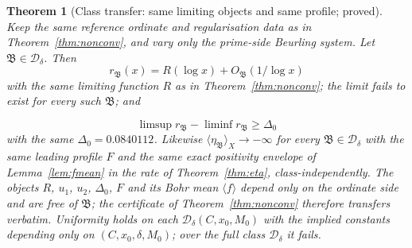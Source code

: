 \documentclass[11pt]{article}
\newtheorem{theorem}{Theorem}[section]
\newcommand{\Dclass}{\mathcal{D}_\delta}        %
\begin{document}
\begin{theorem}[Class transfer: same limiting objects and same profile;
proved]
\label{thm:class}
Keep the same reference ordinate and regularisation data as in
Theorem~\ref{thm:nonconv}, and vary only the prime-side Beurling system.
Let $\mathfrak{B}\in\Dclass$. Then 
\[
r_{\mathfrak{B}}(x)=R(\log x)+O_{\mathfrak{B}}(1/\log x)
\]
 with the \emph{same}
limiting function $R$ as in Theorem~\ref{thm:nonconv}; the limit fails to
exist for every such $\mathfrak{B}$; and

\[
\limsup r_{\mathfrak{B}}-\liminf r_{\mathfrak{B}}\ge\Delta_0
\]
 with the same $\Delta_0=0.0840112$.
Likewise $\langle\eta_{\mathfrak{B}}\rangle_X\to-\infty$ for every $\mathfrak{B}\in\Dclass$ with the
same leading profile $F$ and the same exact positivity envelope of
Lemma~\ref{lem:fmean} in the rate of Theorem~\ref{thm:eta},
class-independently. The objects $R$, $u_1$, $u_2$, $\Delta_0$, $F$ and its
Bohr mean $\langle f\rangle$ depend only on the ordinate side and are free of
$\mathfrak{B}$; the certificate of Theorem~\ref{thm:nonconv} therefore transfers
verbatim.
Uniformity holds on each $\Dclass(C,x_0,M_0)$ with the implied constants
depending only on $(C,x_0,\delta,M_0)$; over the full class $\Dclass$ it
fails.
\end{theorem}
\end{document}
